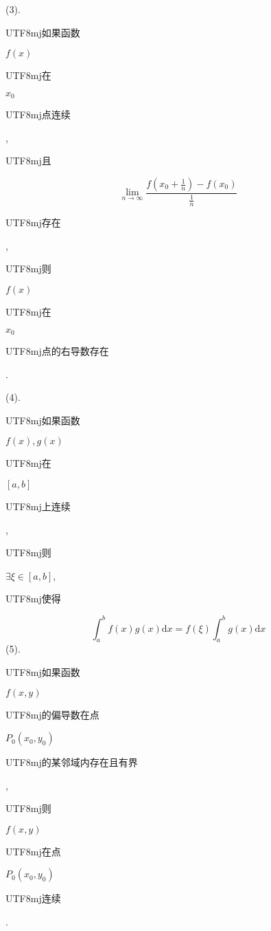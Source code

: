 \documentclass[10pt]{article}
\begin{document}
(3). \begin{CJK}{UTF8}{mj}如果函数\end{CJK} $f(x)$ \begin{CJK}{UTF8}{mj}在\end{CJK} $x_{0}$ \begin{CJK}{UTF8}{mj}点连续\end{CJK}, \begin{CJK}{UTF8}{mj}且\end{CJK}
$$
\lim _{n \rightarrow \infty} \frac{f\left(x_{0}+\frac{1}{n}\right)-f\left(x_{0}\right)}{\frac{1}{n}}
$$
\begin{CJK}{UTF8}{mj}存在\end{CJK}, \begin{CJK}{UTF8}{mj}则\end{CJK} $f(x)$ \begin{CJK}{UTF8}{mj}在\end{CJK} $x_{0}$ \begin{CJK}{UTF8}{mj}点的右导数存在\end{CJK}.

(4). \begin{CJK}{UTF8}{mj}如果函数\end{CJK} $f(x), g(x)$ \begin{CJK}{UTF8}{mj}在\end{CJK} $[a, b]$ \begin{CJK}{UTF8}{mj}上连续\end{CJK}, \begin{CJK}{UTF8}{mj}则\end{CJK} $\exists \xi \in[a, b]$, \begin{CJK}{UTF8}{mj}使得\end{CJK}
$$
\int_{a}^{b} f(x) g(x) \mathrm{d} x=f(\xi) \int_{a}^{b} g(x) \mathrm{d} x
$$
(5). \begin{CJK}{UTF8}{mj}如果函数\end{CJK} $f(x, y)$ \begin{CJK}{UTF8}{mj}的偏导数在点\end{CJK} $P_{0}\left(x_{0}, y_{0}\right)$ \begin{CJK}{UTF8}{mj}的某邻域内存在且有界\end{CJK},\begin{CJK}{UTF8}{mj}则\end{CJK} $f(x, y)$ \begin{CJK}{UTF8}{mj}在点\end{CJK} $P_{0}\left(x_{0}, y_{0}\right)$ \begin{CJK}{UTF8}{mj}连续\end{CJK}.
\end{document}
